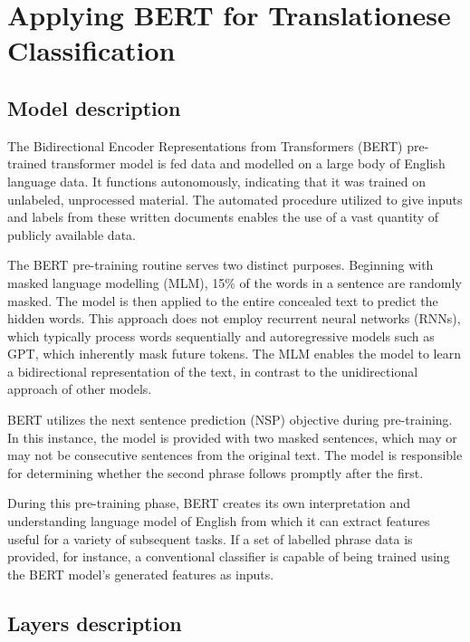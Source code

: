 \chapter{Applying BERT for Translationese Classification}

\section{Model description}

The Bidirectional Encoder Representations from Transformers (BERT) pre-trained transformer model is fed data and modelled on a large body of English language data. It functions autonomously, indicating that it was trained on unlabeled, unprocessed material. The automated procedure utilized to give inputs and labels from these written documents enables the use of a vast quantity of publicly available data.




The BERT pre-training routine serves two distinct purposes. Beginning with masked language modelling (MLM), 15\% of the words in a sentence are randomly masked. The model is then applied to the entire concealed text to predict the hidden words. This approach does not employ recurrent neural networks (RNNs), which typically process words sequentially and autoregressive models such as GPT, which inherently mask future tokens. The MLM enables the model to learn a bidirectional representation of the text, in contrast to the unidirectional approach of other models.




BERT utilizes the next sentence prediction (NSP) objective during pre-training. In this instance, the model is provided with two masked sentences, which may or may not be consecutive sentences from the original text. The model is responsible for determining whether the second phrase follows promptly after the first.


During this pre-training phase, BERT creates its own interpretation and understanding language model of English from which it can extract features useful for a variety of subsequent tasks. If a set of labelled phrase data is provided, for instance, a conventional classifier is capable of being trained using the BERT model's generated features as inputs.




\section{Layers description}

